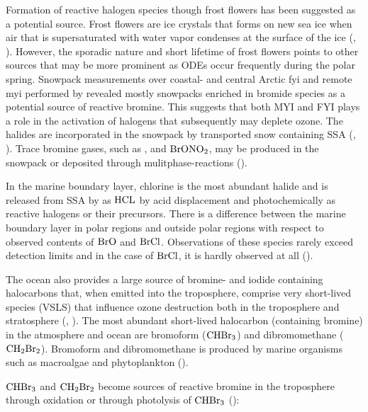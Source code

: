 \medskip

Formation of reactive halogen species though frost flowers has been suggested as a potential source. Frost flowers are ice crystals that forms on new sea ice when air that is supersaturated with water vapor condenses at the surface of the ice (\cite{GRANFORS2013124}, \cite{Kaleschke}). However, the sporadic nature and short lifetime of frost flowers points to other sources that may be more prominent as ODEs occur frequently during the polar spring. Snowpack measurements over coastal- and central Arctic \acrfull{fyi} and remote \acrfull{myi} performed by \cite{Peterson2019} revealed mostly snowpacks enriched in bromide species as a potential source of reactive bromine. This suggests that both MYI and FYI plays a role in the activation of halogens that subsequently may deplete ozone. The halides are incorporated in the snowpack by transported snow containing SSA (\cite{Toyota}, \cite{Peterson2019}). Trace bromine gases, such as ,  and $\mathrm{BrONO_2}$, may be produced in the snowpack or deposited through mulitphase-reactions (\cite{Simpson2005}). 


\medskip


In the marine boundary layer, chlorine is the most abundant halide and is released from SSA by as $\mathrm{HCL}$ by acid displacement and photochemically as reactive halogens or their precursors. There is a difference between the marine boundary layer in polar regions and outside polar regions with respect to observed contents of $\mathrm{BrO}$ and $\mathrm{BrCl}$. Observations of these species rarely exceed detection limits and in the case of $\mathrm{BrCl}$, it is hardly observed at all (\cite{Simpson2015}). 

\medskip

The ocean also provides a large source of bromine- and iodide containing halocarbons that, when emitted into the troposphere, comprise very short-lived species (VSLS) that influence ozone destruction both in the troposphere and stratosphere (\cite{ziska}, \cite{Simpson2015}). The most abundant short-lived halocarbon (containing bromine) in the atmosphere and ocean are bromoform ($\mathrm{CHBr_3}$) and dibromomethane ($\mathrm{CH_2Br_2}$). Bromoform and dibromomethane is produced by marine organisms such as macroalgae and phytoplankton (\cite{Quack2003}).


\medskip

$\mathrm{CHBr_3}$ and $\mathrm{CH_2Br_2}$ become sources of reactive bromine in the troposphere through oxidation or through photolysis of $\mathrm{CHBr_3}$ (\cite{Hossaini2016_chlorine}):


